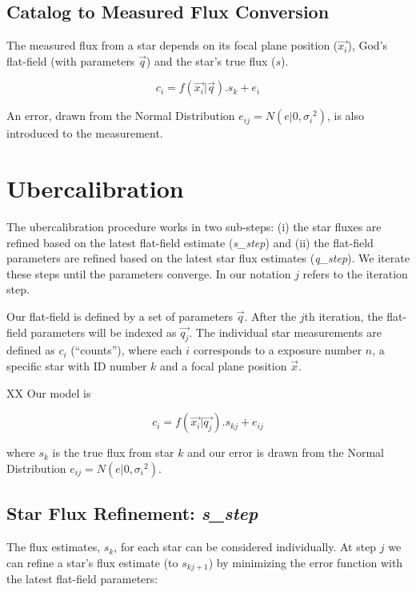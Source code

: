 \documentclass[12pt,a4paper,twoside]{article}
\begin{document}
\subsection{Catalog to Measured Flux Conversion}
The measured flux from a star depends on its focal plane position ($\vec{x_i}$), God's flat-field (with parameters $\vec{q}$) and the star's true flux ($s$). 

\begin{equation}
c_i = f(\vec{x_i} | \vec{q}) . s_{k} + e_{i}
\end{equation}

\noindent{}An error, drawn from the Normal Distribution $e_{ij} = N(e|0,{\sigma_i}^2)$, is also introduced to the measurement.

\section{Ubercalibration}
The ubercalibration procedure works in two sub-steps: (i) the star fluxes are refined based on the latest flat-field estimate (\textit{s\_step}) and (ii) the flat-field parameters are refined based on the latest star flux estimates (\textit{q\_step}). We iterate these steps until the parameters converge. In our notation $j$ refers to the iteration step. 

Our flat-field is defined by a set of parameters $\vec{q}$. After the $j$th iteration, the flat-field parameters will be indexed as $\vec{q_j}$. The individual star measurements are defined as $c_i$ (``counts''), where each $i$ corresponds to a exposure number $n$, a specific star with ID number $k$ and a focal plane position $\vec{x}$.

XX Our model is

\begin{equation}
c_i = f(\vec{x_i} | \vec{q_j}) . s_{kj} + e_{ij}
\end{equation}

where $s_k$ is the true flux from star $k$ and our error is drawn from the Normal Distribution $e_{ij} = N(e|0,{\sigma_i}^2)$.

\subsection{Star Flux Refinement: \textbf{\textit{s\_step}}}
The flux estimates, $s_k$, for each star can be considered individually. At step $j$ we can refine a star's flux estimate (to $s_{kj+1}$) by minimizing the error function with the latest flat-field parameters:
\end{document}
